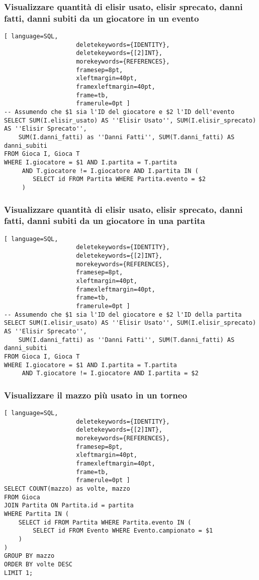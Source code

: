 \documentclass{article}
\begin{document}
\subsubsection{Visualizzare quantità di elisir usato, elisir sprecato, danni fatti, danni subiti da un giocatore in un evento}
\begin{lstlisting}[ language=SQL,
                    deletekeywords={IDENTITY},
                    deletekeywords={[2]INT},
                    morekeywords={REFERENCES},
                    framesep=8pt,
                    xleftmargin=40pt,
                    framexleftmargin=40pt,
                    frame=tb,
                    framerule=0pt ]
-- Assumendo che $1 sia l'ID del giocatore e $2 l'ID dell'evento
SELECT SUM(I.elisir_usato) AS ''Elisir Usato'', SUM(I.elisir_sprecato) AS ''Elisir Sprecato'', 
    SUM(I.danni_fatti) as ''Danni Fatti'', SUM(T.danni_fatti) AS danni_subiti
FROM Gioca I, Gioca T
WHERE I.giocatore = $1 AND I.partita = T.partita
     AND T.giocatore != I.giocatore AND I.partita IN (
        SELECT id FROM Partita WHERE Partita.evento = $2
     )
\end{lstlisting}

\subsubsection{Visualizzare quantità di elisir usato, elisir sprecato, danni fatti, danni subiti da un giocatore in una partita}
\begin{lstlisting}[ language=SQL,
                    deletekeywords={IDENTITY},
                    deletekeywords={[2]INT},
                    morekeywords={REFERENCES},
                    framesep=8pt,
                    xleftmargin=40pt,
                    framexleftmargin=40pt,
                    frame=tb,
                    framerule=0pt ]
-- Assumendo che $1 sia l'ID del giocatore e $2 l'ID della partita
SELECT SUM(I.elisir_usato) AS ''Elisir Usato'', SUM(I.elisir_sprecato) AS ''Elisir Sprecato'', 
    SUM(I.danni_fatti) as ''Danni Fatti'', SUM(T.danni_fatti) AS danni_subiti
FROM Gioca I, Gioca T
WHERE I.giocatore = $1 AND I.partita = T.partita
     AND T.giocatore != I.giocatore AND I.partita = $2
\end{lstlisting}

\subsubsection{Visualizzare il mazzo più usato in un torneo}
\begin{lstlisting}[ language=SQL,
                    deletekeywords={IDENTITY},
                    deletekeywords={[2]INT},
                    morekeywords={REFERENCES},
                    framesep=8pt,
                    xleftmargin=40pt,
                    framexleftmargin=40pt,
                    frame=tb,
                    framerule=0pt ]
SELECT COUNT(mazzo) as volte, mazzo
FROM Gioca 
JOIN Partita ON Partita.id = partita 
WHERE Partita IN (
    SELECT id FROM Partita WHERE Partita.evento IN (
        SELECT id FROM Evento WHERE Evento.campionato = $1
    )
) 
GROUP BY mazzo 
ORDER BY volte DESC 
LIMIT 1;
\end{lstlisting}
\end{document}
